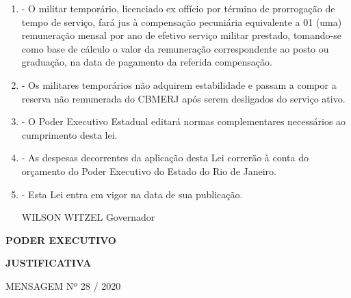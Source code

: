 \documentclass[10pt]{article}
\begin{document}
\begin{enumerate}[label=Art. \arabic*\textdegree]
\item - O militar temporário, licenciado ex offício por término de prorrogação de tempo de serviço, fará jus à compensação pecuniária equivalente a 01 (uma) remuneração mensal por ano de efetivo serviço militar prestado, tomando-se como base de cálculo o valor da remuneração correspondente ao posto ou graduação, na data de pagamento da referida compensação.
\item - Os militares temporários não adquirem estabilidade e passam a compor a reserva não remunerada do CBMERJ após serem desligados do serviço ativo.
\item - O Poder Executivo Estadual editará normas complementares necessários ao cumprimento desta lei.
\item - As despesas decorrentes da aplicação desta Lei correrão à conta do orçamento do Poder Executivo do Estado do Rio de Janeiro.
\item - Esta Lei entra em vigor na data de sua publicação.


WILSON WITZEL
Governador


\end{enumerate}




\begin{center}
  

   \bigskip

  \textbf{  PODER EXECUTIVO}

  \bigskip

  \textbf{JUSTIFICATIVA}
  \bigskip

\end{center}

  MENSAGEM Nº  28 / 2020           
\end{document}
